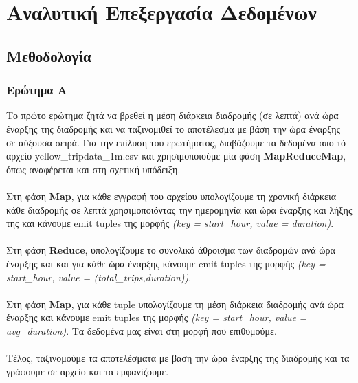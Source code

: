 \documentclass{ntua}
\begin{document}
\justify

\section{Αναλυτική Επεξεργασία Δεδομένων}

\subsection{Μεθοδολογία}

\subsubsection{Ερώτημα Α}
Το πρώτο ερώτημα ζητά να βρεθεί η μέση διάρκεια διαδρομής (σε λεπτά) ανά ώρα έναρξης της διαδρομής και να 
ταξινομιθεί το αποτέλεσμα με βάση την ώρα έναρξης σε αύξουσα σειρά. Για την επίλυση του ερωτήματος, διαβάζουμε τα δεδομένα απο τό αρχείο yellow\_tripdata\_1m.csv και χρησιμοποιούμε μία φάση \textbf{MapReduceMap}, όπως αναφέρεται και στη σχετική υπόδειξη.\\ \\ 
Στη φάση \textbf{Map}, για κάθε εγγραφή του αρχείου υπολογίζουμε τη χρονική διάρκεια κάθε διαδρομής σε λεπτά χρησιμοποιόντας την ημερομηνία και ώρα έναρξης και λήξης της και κάνουμε emit tuples της μορφής \emph{(key = start\_hour, value = duration)}. \\ \\
Στη φάση \textbf{Reduce}, υπολογίζουμε το συνολικό άθροισμα των διαδρομών ανά ώρα έναρξης και 
και για κάθε ώρα έναρξης κάνουμε emit tuples της μορφής \emph{(key = start\_hour, value = (total\_trips,duration))}.\\ \\ 
Στη φάση \textbf{Map}, για κάθε tuple υπολογίζουμε τη μέση διάρκεια διαδρομής ανά ώρα έναρξης και κάνουμε emit tuples της μορφής \emph{(key = start\_hour, value = avg\_duration)}. Τα δεδομένα μας είναι στη μορφή που επιθυμούμε.  \\ \\
Τέλος, ταξινομούμε τα αποτελέσματα με βάση την ώρα έναρξης της διαδρομής και τα γράφουμε σε αρχείο και τα εμφανίζουμε.
\end{document}
